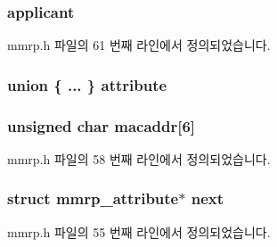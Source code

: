 \subsubsection[{\texorpdfstring{applicant}{applicant}}]{ applicant}\hypertarget{structmmrp__attribute_a9ee7e01253c78c410bf44f18a6372d92}{}\label{structmmrp__attribute_a9ee7e01253c78c410bf44f18a6372d92}


mmrp.\+h 파일의 61 번째 라인에서 정의되었습니다.

\subsubsection[{\texorpdfstring{attribute}{attribute}}]{\setlength{\rightskip}{0pt plus 5cm}union \{ ... \}   attribute}\hypertarget{structmmrp__attribute_ab1c9c414897b81c364683779d24d1de1}{}\label{structmmrp__attribute_ab1c9c414897b81c364683779d24d1de1}
\subsubsection[{\texorpdfstring{macaddr}{macaddr}}]{\setlength{\rightskip}{0pt plus 5cm}unsigned char macaddr\mbox{[}6\mbox{]}}\hypertarget{structmmrp__attribute_a3c39313f42d97e1a0bdb140add9ff200}{}\label{structmmrp__attribute_a3c39313f42d97e1a0bdb140add9ff200}


mmrp.\+h 파일의 58 번째 라인에서 정의되었습니다.

\subsubsection[{\texorpdfstring{next}{next}}]{\setlength{\rightskip}{0pt plus 5cm}struct {\bf mmrp\+\_\+attribute}$\ast$ next}\hypertarget{structmmrp__attribute_a71b7895c31d4661fc0b66940a640e733}{}\label{structmmrp__attribute_a71b7895c31d4661fc0b66940a640e733}


mmrp.\+h 파일의 55 번째 라인에서 정의되었습니다.

